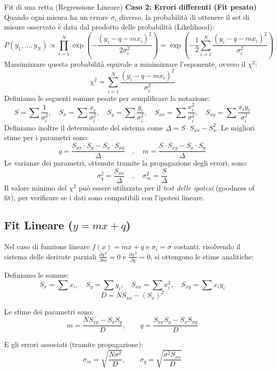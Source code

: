 \documentclass[openany,a4paper,12pt]{book}
\theoremstyle{remark}
\begin{document}
\begin{bressan}{Fit di una retta (Regressione Lineare)}
\textbf{Caso 2: Errori differenti (Fit pesato)}
Quando ogni misura ha un errore $\sigma_i$ diverso, la probabilità di ottenere il set di misure osservato è data dal prodotto delle probabilità (Likelihood):
\[ P(y_1, \ldots, y_N) \propto \prod_{i=1}^N \exp\left( -\frac{(y_i - q - m x_i)^2}{2\sigma_i^2} \right) = \exp\left( -\frac{1}{2} \sum_{i=1}^N \frac{(y_i - q - m x_i)^2}{\sigma_i^2} \right) \]
Massimizzare questa probabilità equivale a minimizzare l'esponente, ovvero il $\chi^2$:
\[ \chi^2 = \sum_{i=1}^N \frac{(y_i - q - m x_i)^2}{\sigma_i^2} \]
Definiamo le seguenti somme pesate per semplificare la notazione:
\[
S = \sum \frac{1}{\sigma_i^2}, \quad S_x = \sum \frac{x_i}{\sigma_i^2}, \quad S_y = \sum \frac{y_i}{\sigma_i^2}, \quad S_{xx} = \sum \frac{x_i^2}{\sigma_i^2}, \quad S_{xy} = \sum \frac{x_i y_i}{\sigma_i^2}
\]
Definiamo inoltre il determinante del sistema come $\Delta = S \cdot S_{xx} - S_x^2$.
Le migliori stime per i parametri sono:
\[
q = \frac{S_{xx} \cdot S_y - S_x \cdot S_{xy}}{\Delta}
\quad , \quad
m = \frac{S \cdot S_{xy} - S_x \cdot S_y}{\Delta}
\]
Le varianze dei parametri, ottenute tramite la propagazione degli errori, sono:
\[
\sigma_q^2 = \frac{S_{xx}}{\Delta}
\quad , \quad
\sigma_m^2 = \frac{S}{\Delta}
\]
Il valore minimo del $\chi^2$ può essere utilizzato per il \textit{test delle ipotesi} (goodness of fit), per verificare se i dati sono compatibili con l'ipotesi lineare.
\end{bressan}

\subsection*{Fit Lineare ($y = mx + q$)}
Nel caso di funzione lineare $f(x) = mx + q$ e $\sigma_i = \sigma$ costanti, risolvendo il sistema delle derivate parziali $\frac{\partial \chi^2}{\partial m} = 0$ e $\frac{\partial \chi^2}{\partial q} = 0$, si ottengono le stime analitiche:

Definiamo le somme:
\[ S_x = \sum x_i, \quad S_y = \sum y_i, \quad S_{xx} = \sum x_i^2, \quad S_{xy} = \sum x_i y_i \]
\[ D = N S_{xx} - (S_x)^2 \]

Le stime dei parametri sono:
\begin{equation}
    m = \frac{N S_{xy} - S_x S_y}{D}, \qquad q = \frac{S_{xx} S_y - S_x S_{xy}}{D}
\end{equation}

E gli errori associati (tramite propagazione):
\begin{equation}
    \sigma_m = \sqrt{\frac{N \sigma^2}{D}}, \qquad \sigma_q = \sqrt{\frac{\sigma^2 S_{xx}}{D}}
\end{equation}
\end{document}
